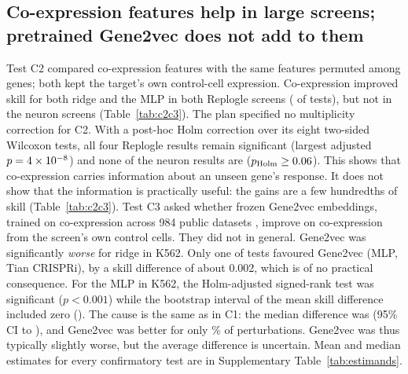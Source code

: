\subsection{Co-expression features help in large screens; pretrained Gene2vec does not add to them}
Test C2 compared co-expression features with the same features permuted among genes; both kept the target's own control-cell expression. Co-expression improved skill for both ridge and the MLP in both Replogle screens (\numNCTwoInformative{} of \numNCTwoTests{} tests), but not in the neuron screens (Table~\ref{tab:c2c3}). The plan specified no multiplicity correction for C2. With a post-hoc Holm correction over its eight two-sided Wilcoxon tests, all four Replogle results remain significant (largest adjusted $p=4\times10^{-8}$) and none of the neuron results are ($p_{\mathrm{Holm}}\ge0.06$). This shows that co-expression carries information about an unseen gene's response. It does not show that the information is practically useful: the gains are a few hundredths of skill (Table~\ref{tab:c2c3}). Test C3 asked whether frozen Gene2vec embeddings, trained on co-expression across 984 public datasets \citep{du2019gene2vec}, improve on co-expression from the screen's own control cells. They did not in general. Gene2vec was significantly \emph{worse} for ridge in K562. Only one of \numNCThreeTests{} tests favoured Gene2vec (MLP, Tian CRISPRi), by a skill difference of about 0.002, which is of no practical consequence. For the MLP in K562, the Holm-adjusted signed-rank test was significant ($p<0.001$) while the bootstrap interval of the mean skill difference included zero (\numCThreeMeanReplogleKEssentialMlpEnsemble). The cause is the same as in C1: the median difference was \numCThreeMedianReplogleKEssentialMlpEnsemble{} (95\% CI \numCThreeMedianLoReplogleKEssentialMlpEnsemble{} to \numCThreeMedianHiReplogleKEssentialMlpEnsemble), and Gene2vec was better for only \numCThreeFracReplogleKEssentialMlpEnsemble\% of perturbations. Gene2vec was thus typically slightly worse, but the average difference is uncertain. Mean and median estimates for every confirmatory test are in Supplementary Table~\ref{tab:estimands}.

\begin{table}[t]
\centering\scriptsize
\caption{Confirmatory tests C2 and C3 on held-out genes. Skill differences are per-perturbation paired means with 95\% bootstrap intervals. C2 is supported (co-expression informative) if the interval lies above 0. C3 uses a two-sided Wilcoxon test, Holm-corrected across its 8 tests.}
\label{tab:c2c3}
\resizebox{\linewidth}{!}{}
\end{table}

